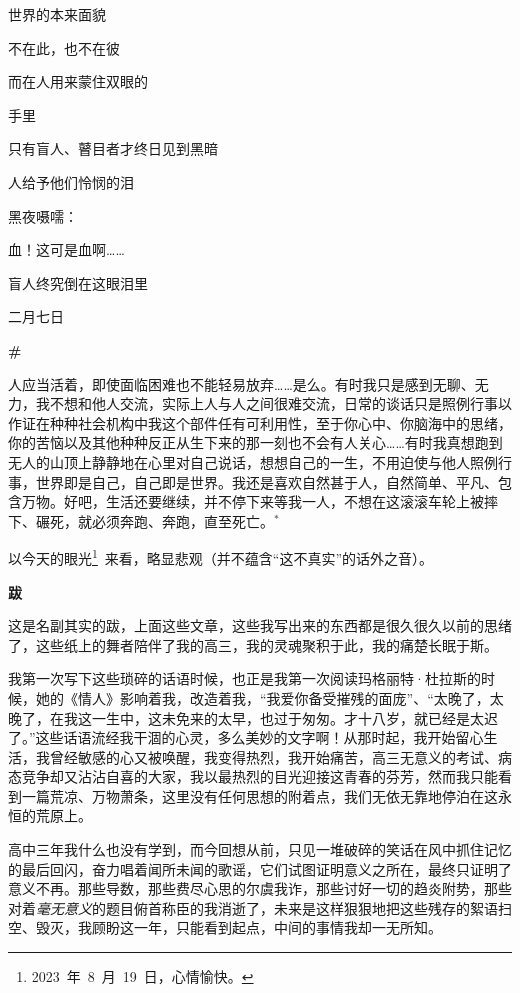 \documentclass{ctexbook}
\begin{document}
\mbox


    世界的本来面貌

    不在此，也不在彼

    而在人用来蒙住双眼的

    手里


\mbox


    只有盲人、瞽目者才终日见到黑暗

    人给予他们怜悯的泪

    黑夜嗫嚅：

    血！这可是血啊……


\mbox


    盲人终究倒在这眼泪里

    \hfill 二月七日

\newpage
\textbf{\#}


\mbox


    人应当活着，即使面临困难也不能轻易放弃……是么。有时我只是感到无聊、无力，我不想和他人交流，实际上人与人之间很难交流，日常的谈话只是照例行事以作证在种种社会机构中我这个部件任有可利用性，至于你心中、你脑海中的思绪，你的苦恼以及其他种种反正从生下来的那一刻也不会有人关心……有时我真想跑到无人的山顶上静静地在心里对自己说话，想想自己的一生，不用迫使与他人照例行事，世界即是自己，自己即是世界。我还是喜欢自然甚于人，自然简单、平凡、包含万物。好吧，生活还要继续，并不停下来等我一人，不想在这滚滚车轮上被摔下、碾死，就必须奔跑、奔跑，直至死亡。\(^*\)


\mbox


    {\normalsize *以今天的眼光\footnote{\normalsize 2023 年 8 月 19 日，心情愉快。} 来看，略显悲观（并不蕴含“这不真实”的话外之音）。}


\newpage
\textbf{跋}


\mbox


    这是名副其实的跋，上面这些文章，这些我写出来的东西都是很久很久以前的思绪了，这些纸上的舞者陪伴了我的高三，我的灵魂聚积于此，我的痛楚长眠于斯。

    我第一次写下这些琐碎的话语时候，也正是我第一次阅读玛格丽特·杜拉斯的时候，她的《情人》影响着我，改造着我，“我爱你备受摧残的面庞”、“太晚了，太晚了，在我这一生中，这未免来的太早，也过于匆匆。才十八岁，就已经是太迟了。”这些话语流经我干涸的心灵，多么美妙的文字啊！从那时起，我开始留心生活，我曾经敏感的心又被唤醒，我变得热烈，我开始痛苦，高三无意义的考试、病态竞争却又沾沾自喜的大家，我以最热烈的目光迎接这青春的芬芳，然而我只能看到一篇荒凉、万物萧条，这里没有任何思想的附着点，我们无依无靠地停泊在这永恒的荒原上。

    高中三年我什么也没有学到，而今回想从前，只见一堆破碎的笑话在风中抓住记忆的最后回闪，奋力唱着闻所未闻的歌谣，它们试图证明意义之所在，最终只证明了意义不再。那些导数，那些费尽心思的尔虞我诈，那些讨好一切的趋炎附势，那些对着\emph{毫无意义}的题目俯首称臣的我消逝了，未来是这样狠狠地把这些残存的絮语扫空、毁灭，我顾盼这一年，只能看到起点，中间的事情我却一无所知。
\end{document}
